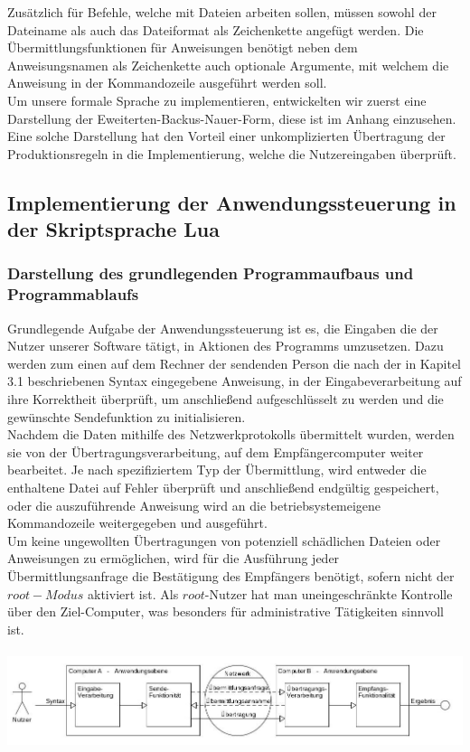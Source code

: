 Zusätzlich für Befehle, welche mit Dateien arbeiten sollen, müssen sowohl der Dateiname als auch das Dateiformat als Zeichenkette angefügt werden. 
Die Übermittlungsfunktionen für Anweisungen benötigt neben dem Anweisungsnamen als Zeichenkette auch optionale Argumente, mit welchem die Anweisung in der Kommandozeile ausgeführt werden soll.\\
Um unsere formale Sprache zu implementieren, entwickelten wir zuerst eine Darstellung der Eweiterten-Backus-Nauer-Form, diese ist im Anhang einzusehen. Eine solche Darstellung hat den Vorteil einer unkomplizierten Übertragung der Produktionsregeln in die Implementierung, welche die Nutzereingaben überprüft.

\subsection{Implementierung der Anwendungssteuerung in der Skriptsprache Lua}

\subsubsection{Darstellung des grundlegenden Programmaufbaus und Programmablaufs}
Grundlegende Aufgabe der Anwendungssteuerung ist es, die Eingaben die der Nutzer unserer Software tätigt, in Aktionen des Programms umzusetzen. Dazu werden zum einen auf dem Rechner der sendenden Person die nach der in Kapitel 3.1 beschriebenen Syntax eingegebene Anweisung, in der Eingabeverarbeitung auf ihre Korrektheit überprüft, um anschließend aufgeschlüsselt zu werden und die gewünschte Sendefunktion zu initialisieren.\\
Nachdem die Daten mithilfe des Netzwerkprotokolls übermittelt wurden, werden sie von der Übertragungsverarbeitung, auf dem Empfängercomputer weiter bearbeitet. Je nach spezifiziertem Typ der Übermittlung, wird entweder die enthaltene Datei auf Fehler überprüft und anschließend endgültig gespeichert, oder die auszuführende Anweisung wird an die betriebsystemeigene Kommandozeile weitergegeben und ausgeführt.\\
Um keine ungewollten Übertragungen von potenziell schädlichen Dateien oder Anweisungen zu ermöglichen, wird für die Ausführung jeder Übermittlungsanfrage die Bestätigung des Empfängers benötigt, sofern nicht der $root-Modus$ aktiviert ist. Als $root$-Nutzer hat man uneingeschränkte Kontrolle über den Ziel-Computer, was besonders für administrative Tätigkeiten sinnvoll ist.\\\hfill\\ 
\includegraphics[scale=.45]{anw.jpg}
